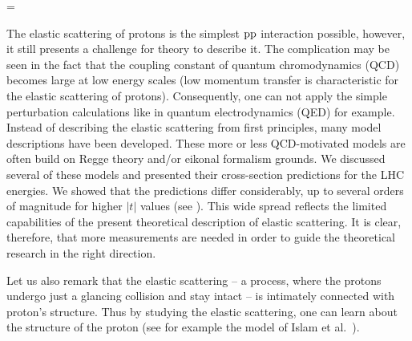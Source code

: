 \BeginText
\footline={\hss\the\pageno\hss\FootText}
\def\makeheadline{}


The elastic scattering of protons is the simplest $\rm pp$ interaction possible, however, it still presents a challenge for theory to describe it. The complication may be seen in the fact that the coupling constant of quantum chromodynamics (QCD) becomes large at low energy scales (low momentum transfer is characteristic for the elastic scattering of protons). Consequently, one can not apply the simple perturbation calculations like in quantum electrodynamics (QED) for example. Instead of describing the elastic scattering from first principles, many model descriptions have been developed. These more or less QCD-motivated models are often build on Regge theory and/or eikonal formalism grounds. We discussed several of these models and presented their cross-section predictions for the LHC energies. We showed that the predictions differ considerably, up to several orders of magnitude for higher $|t|$ values (see ). This wide spread reflects the limited capabilities of the present theoretical description of elastic scattering. It is clear, therefore, that more measurements are needed in order to guide the theoretical research in the right direction.

Let us also remark that the elastic scattering -- a process, where the protons undergo just a glancing collision and stay intact -- is intimately connected with proton's structure. Thus by studying the elastic scattering, one can learn about the structure of the proton (see for example the model of Islam et al.~).


